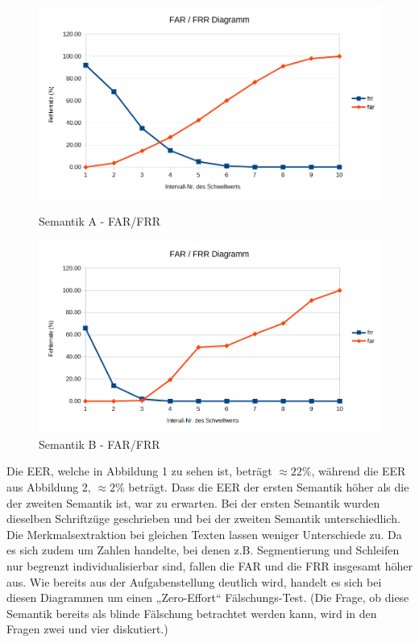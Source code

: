 \documentclass{article}
\begin{document}
\begin{figure}[ht]
	\centering
	\begin{minipage}{0.4\textwidth}
		\centering
		\includegraphics[width=\linewidth]{assets/a-eer}
		\caption{Semantik A - FAR/FRR}
	\end{minipage}%
	\hspace{1em}
	\begin{minipage}{.4\textwidth}
		\centering
		\includegraphics[width=\linewidth]{assets/b-eer}
		\caption{Semantik B - FAR/FRR}
		\label{fig:test2}
	\end{minipage}
\end{figure}

Die EER, welche in Abbildung 1 zu sehen ist, beträgt $\approx22\%$, während die EER aus Abbildung 2,
$\approx2\%$ beträgt. Dass die EER der ersten Semantik höher als die der zweiten Semantik ist, war zu 
erwarten. Bei der ersten Semantik wurden dieselben Schriftzüge geschrieben und bei der zweiten Semantik 
unterschiedlich. Die Merkmalsextraktion bei gleichen Texten lassen weniger Unterschiede zu. Da es sich 
zudem um Zahlen handelte, bei denen z.B. Segmentierung und Schleifen nur begrenzt individualisierbar sind, 
fallen die FAR und die FRR insgesamt höher aus. Wie bereits aus der Aufgabenstellung deutlich wird, 
handelt es sich bei diesen Diagrammen um einen „Zero-Effort“ Fälschungs-Test. (Die Frage, ob diese 
Semantik bereits als blinde Fälschung betrachtet werden kann, wird in den Fragen zwei und vier 
diskutiert.)
\end{document}
